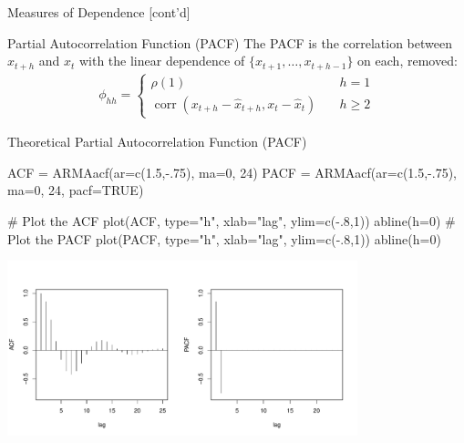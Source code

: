 \documentclass[ignorenonframetext,xcolor=x11names]{beamer}
\begin{document}
\begin{frame}[fragile]{Measures of Dependence \small [cont'd]}
\begin{block}{Partial Autocorrelation Function (PACF)}
The PACF is the correlation between $x_{t+h}$ and $x_t$ with the linear dependence of $\{x_{t+1}, \ldots, x_{t+h-1}\}$ on each, removed:
\begin{align*}
\phi_{hh} = \begin{cases}\rho(1) &\quad h = 1 \\
 \operatorname{corr}(x_{t+h} - \hat{x}_{t+h}, x_t - \hat{x}_t) &\quad h \geq 2
 \end{cases}
\end{align*}
\end{block}
\end{frame}


\begin{frame}[fragile]{Theoretical Partial Autocorrelation Function (PACF)}
\begin{Rcode}
ACF  = ARMAacf(ar=c(1.5,-.75), ma=0, 24)
PACF = ARMAacf(ar=c(1.5,-.75), ma=0, 24, pacf=TRUE)

# Plot the ACF
plot(ACF, type="h", xlab="lag", ylim=c(-.8,1))
abline(h=0)
# Plot the PACF
plot(PACF, type="h", xlab="lag", ylim=c(-.8,1))
abline(h=0)
\end{Rcode}
\vspace{-2\baselineskip}
\begin{center}
\includegraphics[height=2in]{figure20.pdf}
\end{center}
\end{frame}
\end{document}
